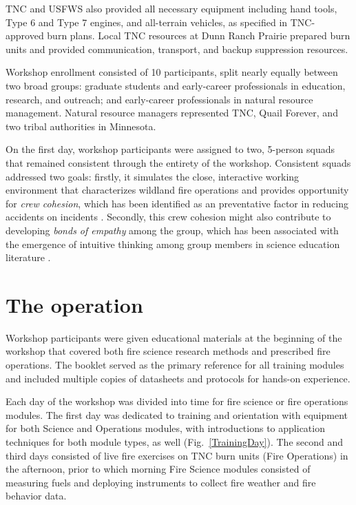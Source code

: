 \documentclass[fire,article,submit,moreauthors,pdftex]{Definitions/mdpi}
\begin{document}
TNC and USFWS also provided all necessary equipment including hand tools, Type 6 and Type 7 engines, and all-terrain vehicles, as specified in TNC-approved burn plans.
Local TNC resources at Dunn Ranch Prairie prepared burn units and provided communication, transport, and backup suppression resources.

Workshop enrollment consisted of 10 participants, split nearly equally between two broad groups: graduate students and early-career professionals in education, research, and outreach; and early-career professionals in natural resource management.
Natural resource managers represented TNC, Quail Forever, and two tribal authorities in Minnesota.

On the first day, workshop participants were assigned to two, 5-person squads that remained consistent through the entirety of the workshop.
Consistent squads addressed two goals: firstly, it simulates the close, interactive working environment that characterizes wildland fire operations and provides opportunity for \emph{crew cohesion}, which has been identified as an preventative factor in reducing accidents on incidents \citep{mcdonald2003}.
Secondly, this crew cohesion might also contribute to developing \emph{bonds of empathy} among the group, which has been associated with the emergence of intuitive thinking among group members in science education literature \citep{park2020}.

\section{The operation}

Workshop participants were given educational materials at the beginning of the workshop that covered both fire science research methods and prescribed fire operations.
The booklet served as the primary reference for all training modules and included multiple copies of datasheets and protocols for hands-on experience.

Each day of the workshop was divided into time for fire science or fire operations modules.
The first day was dedicated to training and orientation with equipment for both Science and Operations modules, with introductions to application techniques for both module types, as well (Fig.~\ref{TrainingDay}).
The second and third days consisted of live fire exercises on TNC burn units (Fire Operations) in the afternoon, prior to which morning Fire Science modules consisted of measuring fuels and deploying instruments to collect fire weather and fire behavior data.
\end{document}
